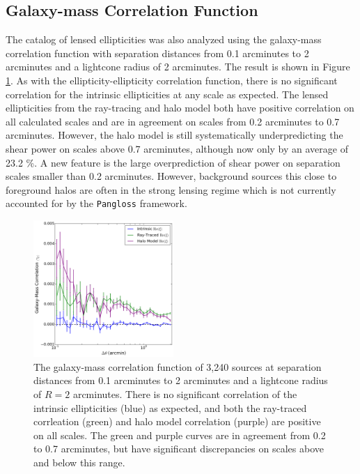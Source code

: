 \documentclass[%
 reprint,
 amsmath,amssymb,
 aps,nofootinbib
]{revtex4-1}
\begin{document}
\subsection*{Galaxy-mass Correlation Function}

The catalog of lensed ellipticities was also analyzed using the galaxy-mass correlation function with separation distances from 0.1 arcminutes to 2 arcminutes and a lightcone radius of 2 arcminutes. The result is shown in Figure \ref{ng_corr}. As with the ellipticity-ellipticity correlation function, there is no significant correlation for the intrinsic ellipticities at any scale as expected. The lensed ellipticities from the ray-tracing and halo model both have positive correlation on all calculated scales and are in agreement on scales from 0.2 arcminutes to 0.7 arcminutes. However, the halo model is still systematically underpredicting the shear power on scales above 0.7 arcminutes, although now only by an average of 23.2 \%. A new feature is the large overprediction of shear power on separation scales smaller than 0.2 arcminutes. However, background sources this close to foreground halos are often in the strong lensing regime which is not currently accounted for by the \texttt{Pangloss} framework.

\begin{figure}
    \centering
    \includegraphics[width=0.475\textwidth]{figs-swe/ng_corr.png}
    \captionsetup{justification=raggedright,singlelinecheck=false}
    \caption{The galaxy-mass correlation function of 3,240 sources at separation distances from 0.1 arcminutes to 2 arcminutes and a lightcone radius of $R=2$ arcminutes. There is no significant correlation of the intrinsic ellipticities (blue) as expected, and both the ray-traced corrleation (green) and halo model correlation (purple) are positive on all scales. The green and purple curves are in agreement from 0.2 to 0.7 arcminutes, but have significant discrepancies on scales above and below this range.}
    \label{ng_corr}
\end{figure}
\end{document}

